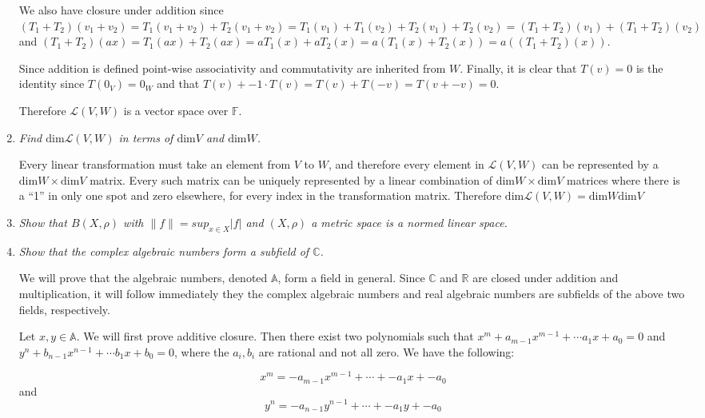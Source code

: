 \documentclass[11pt]{article}
\begin{document}
\begin{enumerate}
We also have closure under addition since $(T_1 + T_2)(v_1 + v_2) = T_1(v_1 + v_2) + T_2(v_1 + v_2) = T_1(v_1) + T_1(v_2) + T_2(v_1) + T_2(v_2) = (T_1 + T_2)(v_1) + (T_1 + T_2)(v_2)$ and $(T_1 + T_2)(ax) = T_1(ax) + T_2(ax) = aT_1(x) + aT_2(x) = a(T_1(x) + T_2(x)) = a((T_1 + T_2)(x))$.  

Since addition is defined point-wise associativity and commutativity are inherited from $W$.  Finally, it is clear that $T(v) = 0$ is the identity since $T(0_V) = 0_W$ and that $T(v) + -1 \cdot T(v) = T(v) + T(-v) = T(v + -v) = 0$.

Therefore $\mathcal{L}(V,W)$ is a vector space over $\mathbb{F}$.

\item \emph{Find $\mathrm{dim} \mathcal{L}(V,W)$ in terms of $\mathrm{dim} V$ and $\mathrm{dim} W$.}

Every linear transformation must take an element from $V$ to $W$, and therefore every element in $\mathcal{L}(V,W)$ can be represented by a $\mathrm{dim} W \times \mathrm{dim} V$ matrix.  Every such matrix can be uniquely represented by a linear combination of $\mathrm{dim} W \times \mathrm{dim} V$ matrices where there is a ``1'' in only one spot and zero elsewhere, for every index in the transformation matrix.  Therefore $\mathrm{dim} \mathcal{L}(V,W) = \mathrm{dim} W \mathrm{dim} V$


\item \emph{Show that $B(X,\rho)$ with $\|f\| = sup_{x \in X}|f|$ and $(X,\rho)$ a metric space is a normed linear space.}

\item \emph{Show that the complex algebraic numbers form a subfield of $\mathbb{C}$.}

We will prove that the algebraic numbers, denoted $\mathbb{A}$, form a field in general.  Since $\mathbb{C}$ and $\mathbb{R}$ are closed under addition and multiplication, it will follow immediately they the complex algebraic numbers and real algebraic numbers are subfields of the above two fields, respectively.

Let $x,y \in \mathbb{A}$.  We will first prove additive closure.  Then there exist two polynomials such that $x^m + a_{m-1}x^{m-1} + \cdots a_1x + a_0 = 0$ and 
$y^n + b_{n-1}x^{n-1} + \cdots b_1x + b_0 = 0$, where the $a_i, b_i$ are rational and not all zero.  We have the following:

\begin{equation}
\label{x-poly}
x^m = -a_{m-1}x^{m-1} + \cdots + -a_1x + -a_0
\end{equation}
and
\begin{equation}
\label{y-poly}
y^n = -a_{n-1}y^{n-1} + \cdots + -a_1y + -a_0
\end{equation}


\end{enumerate}
\end{document}
